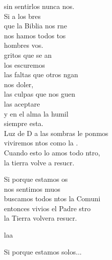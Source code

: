 \begin{cancion}
	sin sentirlos nunca nos.\\
	Si a los bres \\
	que la Biblia nos rne \\
	nos hamos todos tos \\
	hombres vos.\\
	 gritos que se an \\
	los escuremos\\
	las faltas que otros ngan \\
	nos doler,\\
	las culpas que nos guen \\
	las aceptare\\
	y en el alma la humil \\
	siempre esta.\\
	Luz de D a las sombras le ponmos\\
	viviremos ntos como la .\\
	Cuando esto lo amos todo ntro,\\
	la tierra volve a resucr.\\
	\begin{chorus}%
	Si porque estamos os \\
	nos sentimos muos\\
	buscamos todos ntos la Comuni\\
	entonces vivios el Padre stro\\
	la Tierra volvera resucr.\\
	\end{chorus}%
	laa    \\
	\begin{chorus}%
Si porque estamos solos...\\
	\end{chorus}%
\end{cancion}%

